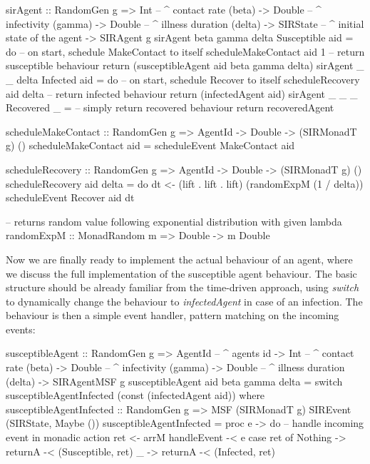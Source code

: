 \begin{HaskellCode}
sirAgent :: RandomGen g 
         => Int         -- ^ contact rate (beta)
         -> Double      -- ^ infectivity (gamma)
         -> Double      -- ^ illness duration (delta)
         -> SIRState    -- ^ initial state of the agent
         -> SIRAgent g
sirAgent beta gamma delta Susceptible aid = do
  -- on start, schedule MakeContact to itself
  scheduleMakeContact aid 1
  -- return susceptible behaviour
  return (susceptibleAgent aid beta gamma delta)
sirAgent _ _ delta Infected aid = do
  -- on start, schedule Recover to itself
  scheduleRecovery aid delta
  -- return infected behaviour
  return (infectedAgent aid)
sirAgent _ _ _ Recovered _ = 
  -- simply return recovered behaviour
  return recoveredAgent

scheduleMakeContact :: RandomGen g => AgentId -> Double -> (SIRMonadT g) ()
scheduleMakeContact aid = scheduleEvent MakeContact aid

scheduleRecovery :: RandomGen g => AgentId -> Double -> (SIRMonadT g) ()
scheduleRecovery aid delta = do
  dt <- (lift . lift . lift) (randomExpM (1 / delta))
  scheduleEvent Recover aid dt

-- returns random value following exponential distribution with given lambda
randomExpM :: MonadRandom m => Double -> m Double
\end{HaskellCode}

Now we are finally ready to implement the actual behaviour of an agent, where we discuss the full implementation of the susceptible agent behaviour. The basic structure should be already familiar from the time-driven approach, using \textit{switch} to dynamically change the behaviour to \textit{infectedAgent} in case of an infection. The behaviour is then a simple event handler, pattern matching on the incoming events:

\begin{HaskellCode}
susceptibleAgent :: RandomGen g 
                 => AgentId        -- ^ agents id
                 -> Int            -- ^ contact rate (beta)
                 -> Double         -- ^ infectivity (gamma)
                 -> Double         -- ^ illness duration (delta)
                 -> SIRAgentMSF g
susceptibleAgent aid beta gamma delta = 
    switch susceptibleAgentInfected (const (infectedAgent aid))
  where
    susceptibleAgentInfected :: RandomGen g 
                             => MSF (SIRMonadT g) SIREvent (SIRState, Maybe ()) 
    susceptibleAgentInfected = proc e -> do
      -- handle incoming event in monadic action
      ret <- arrM handleEvent -< e
      case ret of
        Nothing -> returnA -< (Susceptible, ret)
        _       -> returnA -< (Infected, ret)
\end{HaskellCode}

